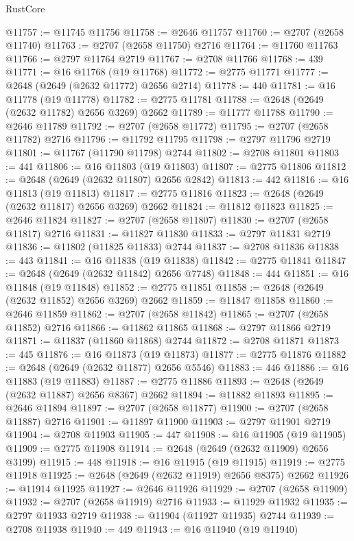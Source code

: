 \begin{lexlean}{RustCore}
\begin{coremodule}
@11757 := @11745 @11756
@11758 := @2646 @11757
@11760 := @2707 (@2658 @11740)
@11763 := @2707 (@2658 @11750) @2716
@11764 := @11760 @11763
@11766 := @2797 @11764 @2719
@11767 := @2708 @11766
@11768 := 439
@11771 := @16 @11768 (@19 @11768)
@11772 := @2775 @11771
@11777 := @2648 (@2649 (@2632 @11772) @2656 @2714)
@11778 := 440
@11781 := @16 @11778 (@19 @11778)
@11782 := @2775 @11781
@11788 := @2648 (@2649 (@2632 @11782) @2656 @3269) @2662
@11789 := @11777 @11788
@11790 := @2646 @11789
@11792 := @2707 (@2658 @11772)
@11795 := @2707 (@2658 @11782) @2716
@11796 := @11792 @11795
@11798 := @2797 @11796 @2719
@11801 := @11767 (@11790 @11798) @2744
@11802 := @2708 @11801
@11803 := 441
@11806 := @16 @11803 (@19 @11803)
@11807 := @2775 @11806
@11812 := @2648 (@2649 (@2632 @11807) @2656 @2842)
@11813 := 442
@11816 := @16 @11813 (@19 @11813)
@11817 := @2775 @11816
@11823 := @2648 (@2649 (@2632 @11817) @2656 @3269) @2662
@11824 := @11812 @11823
@11825 := @2646 @11824
@11827 := @2707 (@2658 @11807)
@11830 := @2707 (@2658 @11817) @2716
@11831 := @11827 @11830
@11833 := @2797 @11831 @2719
@11836 := @11802 (@11825 @11833) @2744
@11837 := @2708 @11836
@11838 := 443
@11841 := @16 @11838 (@19 @11838)
@11842 := @2775 @11841
@11847 := @2648 (@2649 (@2632 @11842) @2656 @7748)
@11848 := 444
@11851 := @16 @11848 (@19 @11848)
@11852 := @2775 @11851
@11858 := @2648 (@2649 (@2632 @11852) @2656 @3269) @2662
@11859 := @11847 @11858
@11860 := @2646 @11859
@11862 := @2707 (@2658 @11842)
@11865 := @2707 (@2658 @11852) @2716
@11866 := @11862 @11865
@11868 := @2797 @11866 @2719
@11871 := @11837 (@11860 @11868) @2744
@11872 := @2708 @11871
@11873 := 445
@11876 := @16 @11873 (@19 @11873)
@11877 := @2775 @11876
@11882 := @2648 (@2649 (@2632 @11877) @2656 @5546)
@11883 := 446
@11886 := @16 @11883 (@19 @11883)
@11887 := @2775 @11886
@11893 := @2648 (@2649 (@2632 @11887) @2656 @8367) @2662
@11894 := @11882 @11893
@11895 := @2646 @11894
@11897 := @2707 (@2658 @11877)
@11900 := @2707 (@2658 @11887) @2716
@11901 := @11897 @11900
@11903 := @2797 @11901 @2719
@11904 := @2708 @11903
@11905 := 447
@11908 := @16 @11905 (@19 @11905)
@11909 := @2775 @11908
@11914 := @2648 (@2649 (@2632 @11909) @2656 @3199)
@11915 := 448
@11918 := @16 @11915 (@19 @11915)
@11919 := @2775 @11918
@11925 := @2648 (@2649 (@2632 @11919) @2656 @8375) @2662
@11926 := @11914 @11925
@11927 := @2646 @11926
@11929 := @2707 (@2658 @11909)
@11932 := @2707 (@2658 @11919) @2716
@11933 := @11929 @11932
@11935 := @2797 @11933 @2719
@11938 := @11904 (@11927 @11935) @2744
@11939 := @2708 @11938
@11940 := 449
@11943 := @16 @11940 (@19 @11940)

\end{coremodule}
\end{lexlean}
